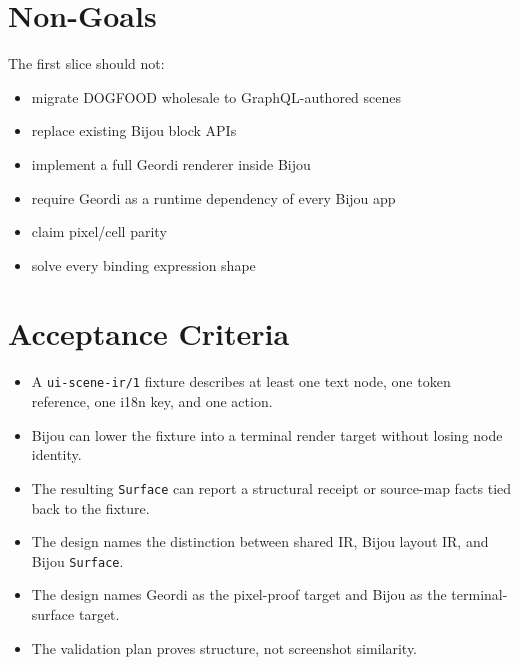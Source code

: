 \section{Non-Goals}\label{record-138-non-goals}

The first slice should not:

\begin{itemize}
\tightlist
\item
  migrate DOGFOOD wholesale to GraphQL-authored scenes
\item
  replace existing Bijou block APIs
\item
  implement a full Geordi renderer inside Bijou
\item
  require Geordi as a runtime dependency of every Bijou app
\item
  claim pixel/cell parity
\item
  solve every binding expression shape
\end{itemize}

\section{Acceptance Criteria}\label{record-138-acceptance-criteria}

\begin{itemize}
\tightlist
\item
  A \texttt{u\allowbreak{}i\allowbreak{}-\allowbreak{}s\allowbreak{}c\allowbreak{}e\allowbreak{}n\allowbreak{}e\allowbreak{}-\allowbreak{}i\allowbreak{}r\allowbreak{}/\allowbreak{}1} fixture describes at least one text node, one token reference, one i18n key, and one action.
\item
  Bijou can lower the fixture into a terminal render target without losing node identity.
\item
  The resulting \texttt{S\allowbreak{}u\allowbreak{}r\allowbreak{}f\allowbreak{}a\allowbreak{}c\allowbreak{}e} can report a structural receipt or source-map facts tied back to the fixture.
\item
  The design names the distinction between shared IR, Bijou layout IR, and Bijou \texttt{S\allowbreak{}u\allowbreak{}r\allowbreak{}f\allowbreak{}a\allowbreak{}c\allowbreak{}e}.
\item
  The design names Geordi as the pixel-proof target and Bijou as the terminal-surface target.
\item
  The validation plan proves structure, not screenshot similarity.
\end{itemize}

